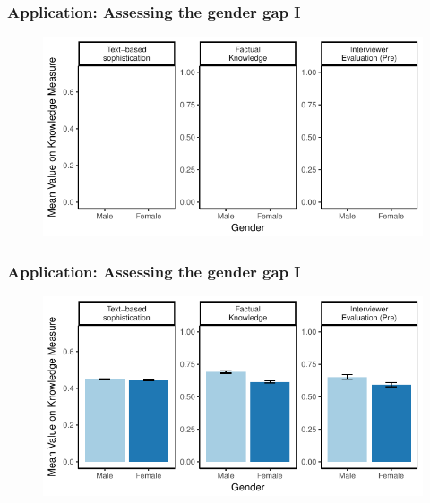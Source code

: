 \documentclass{beamer}
\begin{document}
\begin{frame} %
\frametitle{Application: Assessing the gender gap I}
  \begin{figure}
  \includegraphics{../fig/meandiff_empty.pdf}
  \end{figure}
\end{frame}
\begin{frame} %
\frametitle{Application: Assessing the gender gap I}
  \begin{figure}
  \includegraphics{../fig/meandiff_pres.pdf}
  \end{figure}
\end{frame}
\end{document}
